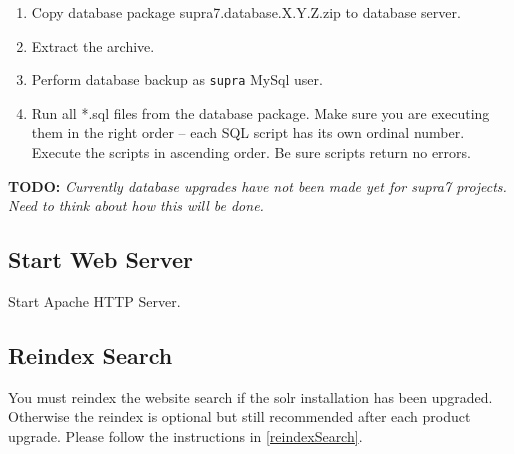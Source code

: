 \documentclass[12pt]{article}
\newcommand{\vigShowNotes}{1}
\newcommand{\vigPackageName}{supra7}
\newcommand{\vigReleaseVersion}{X.Y.Z}
\newcommand{\todo}[1]{
\textbf{TODO:} 
\textit{#1}
}
\begin{document}
\begin{enumerate}
	\item Copy database package {\vigPackageName}.database.\vigReleaseVersion.zip to database server.
	\item Extract the archive.
	\item Perform database backup as \texttt{supra} MySql user.
	\item Run all *.sql files from the database package. Make sure you are executing them in the right order -- each SQL script has its own ordinal number. Execute the scripts in ascending order. Be sure scripts return no errors.
\end{enumerate}

\todo{Currently database upgrades have not been made yet for supra7 projects. Need to think about how this will be done.}

\subsection{Start Web Server}
Start Apache HTTP Server.

\subsection{Reindex Search}

You must reindex the website search if the solr installation has been upgraded. Otherwise the reindex is optional but still recommended after each product upgrade. Please follow the instructions in \ref{reindexSearch}.
\end{document}
